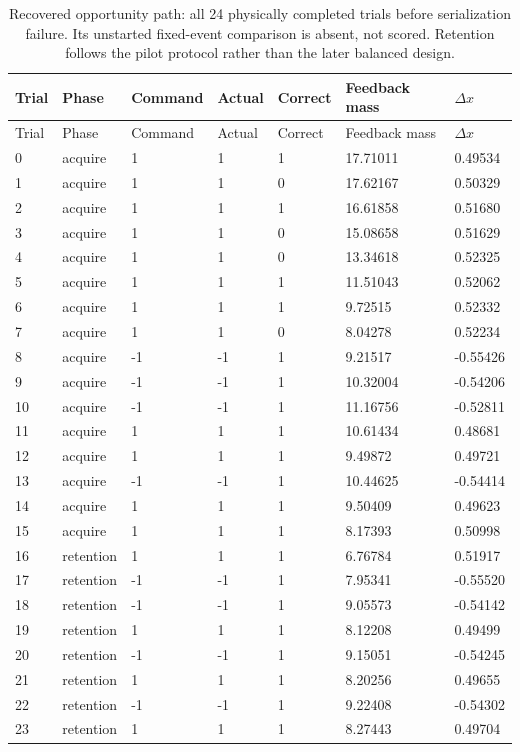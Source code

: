 \begin{longtable}{lllllll}
\caption{Recovered opportunity path: all 24 physically completed trials before serialization failure. Its unstarted fixed-event comparison is absent, not scored. Retention follows the pilot protocol rather than the later balanced design.}\label{tab:local-history-pilot}\\
\toprule
Trial & Phase & Command & Actual & Correct & Feedback mass & $\Delta x$ \\
\midrule
\endfirsthead
\toprule
Trial & Phase & Command & Actual & Correct & Feedback mass & $\Delta x$ \\
\midrule
\endhead
0 & acquire & 1 & 1 & 1 & 17.71011 & 0.49534 \\
1 & acquire & 1 & 1 & 0 & 17.62167 & 0.50329 \\
2 & acquire & 1 & 1 & 1 & 16.61858 & 0.51680 \\
3 & acquire & 1 & 1 & 0 & 15.08658 & 0.51629 \\
4 & acquire & 1 & 1 & 0 & 13.34618 & 0.52325 \\
5 & acquire & 1 & 1 & 1 & 11.51043 & 0.52062 \\
6 & acquire & 1 & 1 & 1 & 9.72515 & 0.52332 \\
7 & acquire & 1 & 1 & 0 & 8.04278 & 0.52234 \\
8 & acquire & -1 & -1 & 1 & 9.21517 & -0.55426 \\
9 & acquire & -1 & -1 & 1 & 10.32004 & -0.54206 \\
10 & acquire & -1 & -1 & 1 & 11.16756 & -0.52811 \\
11 & acquire & 1 & 1 & 1 & 10.61434 & 0.48681 \\
12 & acquire & 1 & 1 & 1 & 9.49872 & 0.49721 \\
13 & acquire & -1 & -1 & 1 & 10.44625 & -0.54414 \\
14 & acquire & 1 & 1 & 1 & 9.50409 & 0.49623 \\
15 & acquire & 1 & 1 & 1 & 8.17393 & 0.50998 \\
16 & retention & 1 & 1 & 1 & 6.76784 & 0.51917 \\
17 & retention & -1 & -1 & 1 & 7.95341 & -0.55520 \\
18 & retention & -1 & -1 & 1 & 9.05573 & -0.54142 \\
19 & retention & 1 & 1 & 1 & 8.12208 & 0.49499 \\
20 & retention & -1 & -1 & 1 & 9.15051 & -0.54245 \\
21 & retention & 1 & 1 & 1 & 8.20256 & 0.49655 \\
22 & retention & -1 & -1 & 1 & 9.22408 & -0.54302 \\
23 & retention & 1 & 1 & 1 & 8.27443 & 0.49704 \\
\bottomrule
\end{longtable}
